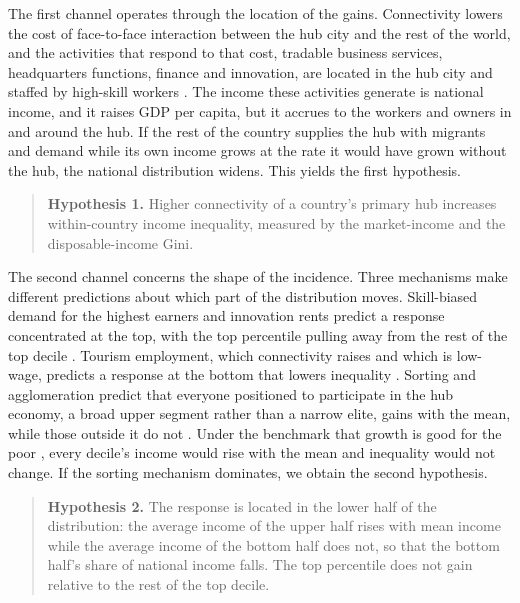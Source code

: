 The first channel operates through the location of the gains. Connectivity lowers the cost of face-to-face interaction between the hub city and the rest of the world, and the activities that respond to that cost, tradable business services, headquarters functions, finance and innovation, are located in the hub city and staffed by high-skill workers \citep{Brueckner_2003,Campante_2018,Giroud_2013}. The income these activities generate is national income, and it raises GDP per capita, but it accrues to the workers and owners in and around the hub. If the rest of the country supplies the hub with migrants and demand while its own income grows at the rate it would have grown without the hub, the national distribution widens. This yields the first hypothesis.

\begin{quote}
\textbf{Hypothesis 1.} Higher connectivity of a country's primary hub increases within-country income inequality, measured by the market-income and the disposable-income Gini.
\end{quote}

The second channel concerns the shape of the incidence. Three mechanisms make different predictions about which part of the distribution moves. Skill-biased demand for the highest earners and innovation rents predict a response concentrated at the top, with the top percentile pulling away from the rest of the top decile \citep{Aghion_2018}. Tourism employment, which connectivity raises and which is low-wage, predicts a response at the bottom that lowers inequality \citep{Khadaroo_2008,Faber_2019}. Sorting and agglomeration predict that everyone positioned to participate in the hub economy, a broad upper segment rather than a narrow elite, gains with the mean, while those outside it do not \citep{Diamond_2016,Gaubert_2018,Young_2013}. Under the benchmark that growth is good for the poor \citep{Dollar_2016}, every decile's income would rise with the mean and inequality would not change. If the sorting mechanism dominates, we obtain the second hypothesis.

\begin{quote}
\textbf{Hypothesis 2.} The response is located in the lower half of the distribution: the average income of the upper half rises with mean income while the average income of the bottom half does not, so that the bottom half's share of national income falls. The top percentile does not gain relative to the rest of the top decile.
\end{quote}

